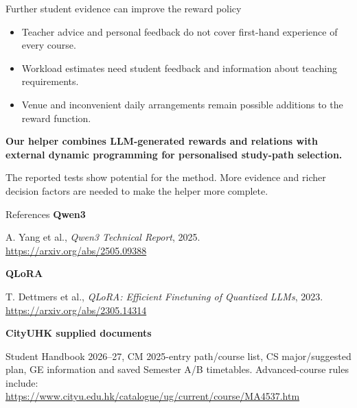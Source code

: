 \documentclass[aspectratio=169,11pt]{beamer}
\newcommand{\smallnote}[1]{\par{\footnotesize\color{muted}#1\par}}
\begin{document}
\begin{frame}{Further student evidence can improve the reward policy}
\begin{itemize}\setlength{\itemsep}{6pt}
\item Teacher advice and personal feedback do not cover first-hand experience of every course.
\item Workload estimates need student feedback and information about teaching requirements.
\item Venue and inconvenient daily arrangements remain possible additions to the reward function.
\end{itemize}
\vspace{3mm}
\textbf{Our helper combines LLM-generated rewards and relations with external dynamic programming for personalised study-path selection.}
\smallnote{The reported tests show potential for the method. More evidence and richer decision factors are needed to make the helper more complete.}
\end{frame}

\begin{frame}{References}
\small
\textbf{Qwen3}\par
A. Yang et al., \emph{Qwen3 Technical Report}, 2025.\\
\url{https://arxiv.org/abs/2505.09388}\par
\vspace{3mm}
\textbf{QLoRA}\par
T. Dettmers et al., \emph{QLoRA: Efficient Finetuning of Quantized LLMs}, 2023.\\
\url{https://arxiv.org/abs/2305.14314}\par
\vspace{3mm}
\textbf{CityUHK supplied documents}\par
Student Handbook 2026--27, CM 2025-entry path/course list, CS major/suggested plan, GE information and saved Semester A/B timetables. Advanced-course rules include:\\
\url{https://www.cityu.edu.hk/catalogue/ug/current/course/MA4537.htm}
\end{frame}
\end{document}
